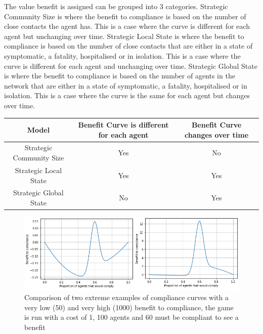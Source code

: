 \documentclass{article}
\begin{document}
The value benefit  is assigned can be grouped into 3 categories. Strategic Community Size is where the benefit to compliance is based on the number of close contacts the agent has. This is a case where the curve is different for each agent but unchanging over time. Strategic Local State is where the benefit to compliance is based on the number of close contacts that are either in a state of symptomatic, a fatality, hospitalised or in isolation. This is a case where the curve is different for each agent and unchanging over time. Strategic Global State is where the benefit to compliance is based on the number of agents in the network that are either in a state of symptomatic, a fatality, hospitalised or in isolation. This is a case where the curve is the same for each agent but changes over time.

\begin{tabular}{|c|c|c|}
\hline
Model & Benefit Curve is different for each agent & Benefit Curve changes over time\\ \hline
Strategic Community Size & Yes & No \\ \hline
Strategic Local State & Yes &Yes\\ \hline
Strategic Global State & No &Yes\\ \hline
\end{tabular}
\newline


\begin{figure}[h!]
\centering
\includegraphics[width=12cm]{strat}
\caption{Comparison of two extreme examples of compliance curves with a very low (50) and very high (1000) benefit to compliance, the game is run with a cost of 1, 100 agents and 60 must be compliant to see a benefit}
\end{figure}
\end{document}
